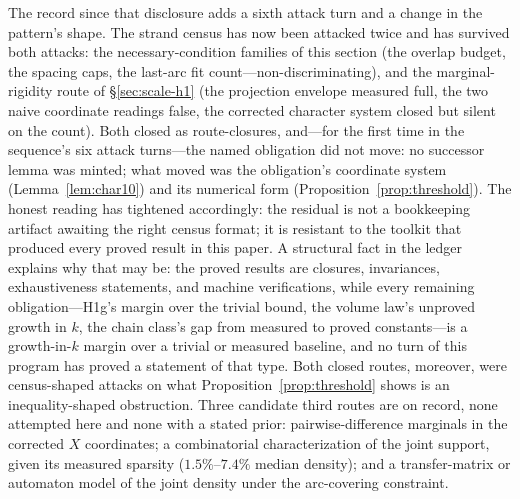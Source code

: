 The record since that disclosure adds a sixth attack turn and a change
in the pattern's shape. The strand census has now been attacked twice
and has survived both attacks: the necessary-condition families of
this section (the overlap budget, the spacing caps, the last-arc fit
count---non-discriminating), and the marginal-rigidity route of
\S\ref{sec:scale-h1} (the projection envelope measured full, the two
naive coordinate readings false, the corrected character system closed
but silent on the count). Both closed as route-closures, and---for the
first time in the sequence's six attack turns---the named obligation
did not move: no successor lemma was minted; what moved was the
obligation's coordinate system (Lemma~\ref{lem:char10}) and its
numerical form (Proposition~\ref{prop:threshold}). The honest reading
has tightened accordingly: the residual is not a bookkeeping artifact
awaiting the right census format; it is resistant to the toolkit that
produced every proved result in this paper. A structural fact in the
ledger explains why that may be: the proved results are closures,
invariances, exhaustiveness statements, and machine verifications,
while every remaining obligation---H1g's margin over the trivial
bound, the volume law's unproved growth in $k$, the chain class's gap
from measured to proved constants---is a growth-in-$k$ margin over a
trivial or measured baseline, and no turn of this program has proved a
statement of that type. Both closed routes, moreover, were
census-shaped attacks on what Proposition~\ref{prop:threshold} shows
is an inequality-shaped obstruction. Three candidate third routes are
on record, none attempted here and none with a stated prior:
pairwise-difference marginals in the corrected $X$ coordinates; a
combinatorial characterization of the joint support, given its
measured sparsity ($1.5\%$--$7.4\%$ median density); and a
transfer-matrix or automaton model of the joint density under the
arc-covering constraint.

